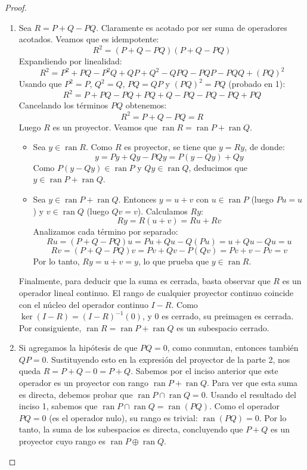 \documentclass{article}
\theoremstyle{definition}
\begin{document}
\begin{proof}
\begin{enumerate}
		\item Sea \(R = P + Q - PQ\). Claramente es acotado por ser suma de operadores acotados. Veamos que es idempotente:
		      \[ R^2 = (P + Q - PQ)(P + Q - PQ) \]
		      Expandiendo por linealidad:
		      \[ R^2 = P^2 + PQ - P^2Q + QP + Q^2 - QPQ - PQP - PQQ + {(PQ)}^2 \]
		      Usando que \(P^2=P\), \(Q^2=Q\), \(PQ=QP\) y \({(PQ)}^2=PQ\) (probado en 1):
		      \[ R^2 = P + PQ - PQ + PQ + Q - PQ - PQ - PQ + PQ \]
		      Cancelando los términos \(PQ\) obtenemos:
		      \[ R^2 = P + Q - PQ = R \]
		      Luego \(R\) es un proyector. Veamos que \(\operatorname{ran} R = \operatorname{ran} P + \operatorname{ran} Q\).
		      \begin{itemize}
			      \item[(\(\subseteq \))] Sea \(y \in \operatorname{ran} R\). Como \(R\) es proyector, se tiene que \(y = Ry\), de donde:
			            \[ y = Py + Qy - PQy = P(y - Qy) + Qy \]
			            Como \(P(y - Qy) \in \operatorname{ran} P\) y \(Qy \in \operatorname{ran} Q\), deducimos que \(y \in \operatorname{ran} P + \operatorname{ran} Q\).
			      \item[(\(\supseteq \))] Sea \(y \in \operatorname{ran} P + \operatorname{ran} Q\). Entonces \(y = u + v\) con \(u \in \operatorname{ran} P\) (luego \(Pu = u\)) y \(v \in \operatorname{ran} Q\) (luego \(Qv = v\)). Calculamos \(Ry\):
			            \[ Ry = R(u+v) = Ru + Rv \]
			            Analizamos cada término por separado:
			            \[ Ru = (P + Q - PQ)u = Pu + Qu - Q(Pu) = u + Qu - Qu = u \]
			            \[ Rv = (P + Q - PQ)v = Pv + Qv - P(Qv) = Pv + v - Pv = v \]
			            Por lo tanto, \(Ry = u + v = y\), lo que prueba que \(y \in \operatorname{ran} R\).
		      \end{itemize}
		      Finalmente, para deducir que la suma es cerrada, basta observar que \(R\) es un operador lineal continuo. El rango de cualquier proyector continuo coincide con el núcleo del operador continuo \(I - R\). Como \(\ker(I-R) = {(I-R)}^{-1}({0})\), y \({0}\) es cerrado, su preimagen es cerrada. Por consiguiente, \(\operatorname{ran} R = \operatorname{ran} P + \operatorname{ran} Q\) es un subespacio cerrado.

		\item Si agregamos la hipótesis de que \(PQ = 0\), como conmutan, entonces también \(QP = 0\).
		      Sustituyendo esto en la expresión del proyector de la parte 2, nos queda \(R = P + Q - 0 = P + Q\). Sabemos por el inciso anterior que este operador es un proyector con rango \(\operatorname{ran} P + \operatorname{ran} Q\).
		      Para ver que esta suma es directa, debemos probar que \(\operatorname{ran} P \cap \operatorname{ran} Q = {0}\).
		      Usando el resultado del inciso 1, sabemos que \(\operatorname{ran} P \cap \operatorname{ran} Q = \operatorname{ran}(PQ)\).
		      Como el operador \(PQ = 0\) (es el operador nulo), su rango es trivial: \(\operatorname{ran}(PQ) = {0}\).
		      Por lo tanto, la suma de los subespacios es directa, concluyendo que \(P+Q\) es un proyector cuyo rango es \(\operatorname{ran} P \oplus \operatorname{ran} Q\).
	\end{enumerate}
\end{proof}
\end{document}
